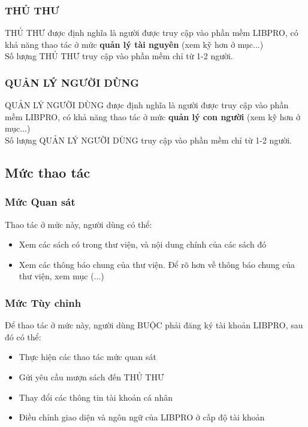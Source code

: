 \documentclass[12pt,a4paper]{report}
\begin{document}
			\subsubsection{THỦ THƯ}
				THỦ THƯ được định nghĩa là người được truy cập vào phần mềm LIBPRO, có khả năng thao tác ở mức \textbf{quản lý tài nguyên} (xem kỹ hơn ở mục...) \\
				Số lượng THỦ THƯ truy cập vào phần mềm chỉ từ 1-2 người.
			\subsubsection{QUẢN LÝ NGƯỜI DÙNG}
				QUẢN LÝ NGƯỜI DÙNG được định nghĩa là người được truy cập vào phần mềm LIBPRO, có khả năng thao tác ở mức \textbf{quản lý con người} (xem kỹ hơn ở mục...) \\
				Số lượng QUẢN LÝ NGƯỜI DÙNG truy cập vào phần mềm chỉ từ 1-2 người.
		\subsection{Mức thao tác}
			\subsubsection{Mức Quan sát}
			Thao tác ở mức này, người dùng có thể:
			\begin{itemize}
				\item Xem các sách có trong thư viện, và nội dung chính của các sách đó
				\item Xem các thông báo chung của thư viện. Để rõ hơn về thông báo chung của thư viện, xem mục (...)
			\end{itemize}

			\subsubsection{Mức Tùy chỉnh}
			Để thao tác ở mức này, người dùng BUỘC phải đăng ký tài khoản LIBPRO, sau đó có thể:
			\begin{itemize}
				\item Thực hiện các thao tác mức quan sát
				\item Gửi yêu cầu mượn sách đến THỦ THƯ
				\item Thay đổi các thông tin tài khoản cá nhân
				\item Điều chỉnh giao diện và ngôn ngữ của LIBPRO ở cấp độ tài khoản
			\end{itemize}
\end{document}
